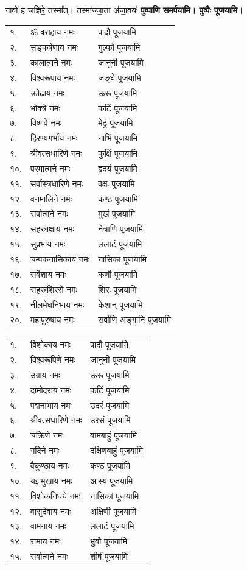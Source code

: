 \begin{center}
{गावो॑ ह जज्ञिरे॒ तस्मा᳚त्। तस्मा᳚ज्जा॒ता अ॑जा॒वयः॑}
\textbf{\devAya{} पुष्पाणि समर्पयामि। पुष्पैः पूजयामि।}

\begin{longtable}{ll@{— }l}
१.&	ॐ वराहाय नमः & पादौ पूजयामि\\
२.&	सङ्कर्षणाय नमः & गुल्फौ पूजयामि\\
३.&	कालात्मने नमः & जानुनी पूजयामि\\
४.&	विश्वरूपाय नमः & जङ्घे पूजयामि\\
५.&	क्रोढाय नमः & ऊरू पूजयामि\\
६.&	भोक्त्रे नमः & कटिं पूजयामि\\
७.&	विष्णवे नमः & मेढ्रं पूजयामि\\
८.&	हिरण्यगर्भाय नमः & नाभिं पूजयामि\\
९.&	श्रीवत्सधारिणे नमः & कुक्षिं पूजयामि\\
१०.& परमात्मने नमः & हृदयं पूजयामि\\
११.& सर्वास्त्रधारिणे नमः & वक्षः पूजयामि\\
१२.& वनमालिने नमः & कण्ठं पूजयामि\\
१३.& सर्वात्मने नमः & मुखं पूजयामि\\
१४.& सहस्राक्षाय नमः & नेत्राणि पूजयामि\\
१५.& सुप्रभाय नमः & ललाटं पूजयामि\\
१६.& चम्पकनासिकाय नमः & नासिकां पूजयामि\\
१७.& सर्वेशाय नमः & कर्णौ पूजयामि\\
१८.& सहस्रशिरसे नमः & शिरः पूजयामि\\
१९.& नीलमेघनिभाय नमः & केशान् पूजयामि\\
२०.& महापुरुषाय नमः & सर्वाणि अङ्गानि पूजयामि\\
\end{longtable}

\begin{longtable}{ll@{— }l}
१.& विशोकाय नमः & पादौ पूजयामि\\
२.& विश्वरूपिणे नमः & जानुनी  पूजयामि\\
३.& उग्राय नमः & ऊरू पूजयामि\\
४.& दामोदराय नमः & कटिं पूजयामि\\
५.& पद्मनाभाय नमः & उदरं   पूजयामि\\
६.& श्रीवत्सधारिणे नमः & उरसं  पूजयामि\\
७.& चक्रिणे नमः & वामबाहुं  पूजयामि\\
८.& गदिने नमः & दक्षिणबाहुं पूजयामि\\
९.& वैकुण्ठाय नमः & कण्ठं पूजयामि\\
१०.& यज्ञमुखाय नमः & आस्यं पूजयामि\\
११.& विशोकनिधये नमः & नासिकां पूजयामि\\
१२.& वासुदेवाय नमः & अक्षिणी पूजयामि\\
१३.& वामनाय नमः & ललाटं पूजयामि\\
१४.& रामाय नमः & भ्रुवौ  पूजयामि\\
१५.& सर्वात्मने नमः & शीर्षं पूजयामि\\
\end{longtable}


\end{center}
